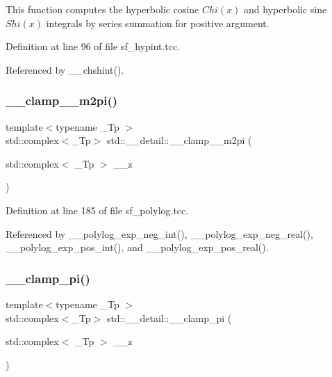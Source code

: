 This function computes the hyperbolic cosine $ Chi(x) $ and hyperbolic sine $ Shi(x) $ integrals by series summation for positive argument. 



Definition at line 96 of file sf\+\_\+hypint.\+tcc.



Referenced by \+\_\+\+\_\+chshint().

\mbox{\label{namespacestd_1_1____detail_a4b52c9c0f24edd3c61c771f55f20002b}} 
\subsubsection{\texorpdfstring{\+\_\+\+\_\+clamp\+\_\+\_\+m2pi()}{\_\_clamp\_0\_m2pi()}}
{\footnotesize\ttfamily template$<$typename \+\_\+\+Tp $>$ \\
std\+::complex$<$\+\_\+\+Tp$>$ std\+::\+\_\+\+\_\+detail\+::\+\_\+\+\_\+clamp\+\_\+\_\+m2pi (\begin{DoxyParamCaption}\item[{std\+::complex$<$ \+\_\+\+Tp $>$}]{\+\_\+\+\_\+z }\end{DoxyParamCaption})}



Definition at line 185 of file sf\+\_\+polylog.\+tcc.



Referenced by \+\_\+\+\_\+polylog\+\_\+exp\+\_\+neg\+\_\+int(), \+\_\+\+\_\+polylog\+\_\+exp\+\_\+neg\+\_\+real(), \+\_\+\+\_\+polylog\+\_\+exp\+\_\+pos\+\_\+int(), and \+\_\+\+\_\+polylog\+\_\+exp\+\_\+pos\+\_\+real().

\mbox{\label{namespacestd_1_1____detail_aa341299d514aa754403a775b9ed51c91}} 
\subsubsection{\texorpdfstring{\+\_\+\+\_\+clamp\+\_\+pi()}{\_\_clamp\_pi()}}
{\footnotesize\ttfamily template$<$typename \+\_\+\+Tp $>$ \\
std\+::complex$<$\+\_\+\+Tp$>$ std\+::\+\_\+\+\_\+detail\+::\+\_\+\+\_\+clamp\+\_\+pi (\begin{DoxyParamCaption}\item[{std\+::complex$<$ \+\_\+\+Tp $>$}]{\+\_\+\+\_\+z }\end{DoxyParamCaption})}



